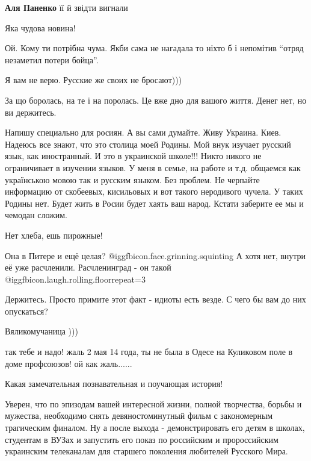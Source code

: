 \begin{itemize}
\begin{itemize} %
\textbf{Аля Паненко} її й звідти вигнали
\end{itemize} %

Яка чудова новина!

Ой. Кому ти потрібна чума. Якби сама не нагадала то ніхто б і непомітив \enquote{отряд незаметил потери бойца}.

Я вам не верю. Русские же своих не бросают)))

За що боролась, на те і на поролась.
Це вже дно для вашого життя.
Денег нет, но ви держитесь.


Напишу специально для росиян. А вы сами думайте. Живу Украина. Киев. Надеюсь
все знают, что это столица моей Родины. Мой внук изучает русский язык, как
иностранный. И это в украинской школе!!! Никто никого не ограничивает в
изучении языков. У меня в семье, на работе и т.д. общаемся как українською
мовою так и русским языком. Без проблем. Не черпайте информацию от скобеевых,
кисильовых и вот такого неродивого чучела. У таких Родины нет. Будет жить в
Росии будет хаять ваш народ. Кстати заберите ее мы и чемодан сложим.

Нет хлеба, ешь пирожные!

Она в Питере и ещё целая? @igg{fbicon.face.grinning.squinting} 
А хотя нет, внутри её уже расчленили. Расчленинград - он такой  @igg{fbicon.laugh.rolling.floor}{repeat=3} 

Держитесь. Просто примите этот факт - идиоты есть везде. С чего бы вам до них опускаться?

Вяликомучаница )))

так тебе и надо! жаль 2 мая 14 года, ты не была в Одесе на Куликовом поле в доме профсоюзов! ой как жаль......


Какая замечательная познавательная и поучающая история!

Уверен, что по эпизодам вашей интересной жизни, полной творчества, борьбы и
мужества, необходимо снять девяностоминутный фильм с закономерным трагическим
финалом. Ну а после выхода - демонстрировать его детям в школах, студентам в
ВУЗах и запустить его показ по российским и пророссийским украинским
телеканалам для старшего поколения любителей Русского Мира.



\end{itemize}
